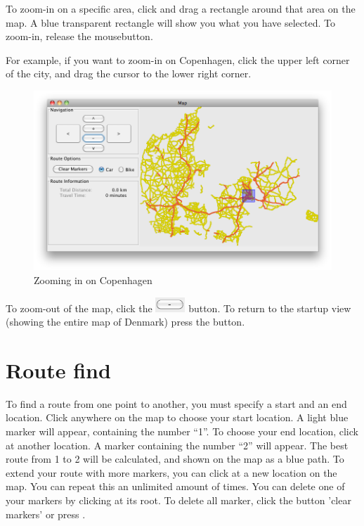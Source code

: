 To zoom-in on a specific area, click and drag a rectangle around that
area on the map. A blue transparent rectangle will show you what you have
selected. To zoom-in, release the mousebutton.

For example, if you want to zoom-in on Copenhagen,
click the upper left corner of the city, and drag the cursor to the lower right
corner.

\begin{figure}[h!]
\centering
\includegraphics[width=1\linewidth]{images/man-copenhagen.png}
\caption{Zooming in on Copenhagen}
\label{MAN-Z-COP}
\end{figure}

To zoom-out of the map, click the
\includegraphics[height=1.5em]{images/zoomoutbutton.png} button. To return to
the startup view (showing the entire map of Denmark) press the  button.

\section{Route find}
\label{MAN-RF}
To find a route from one point to another, you must specify a start and an end
location. Click anywhere on the map to choose your start location. A light blue
marker will appear, containing the number ``1''. To choose your end location,
click at another location. A marker containing the number ``2'' will appear. The
best route from 1 to 2 will be calculated, and shown on the map as a blue path.
To extend your route with more markers, you can click at a new location on the
map. You can repeat this an unlimited amount of times. You can delete one of
your markers by clicking at its root. To delete all marker, click the button
'clear markers' or press .

